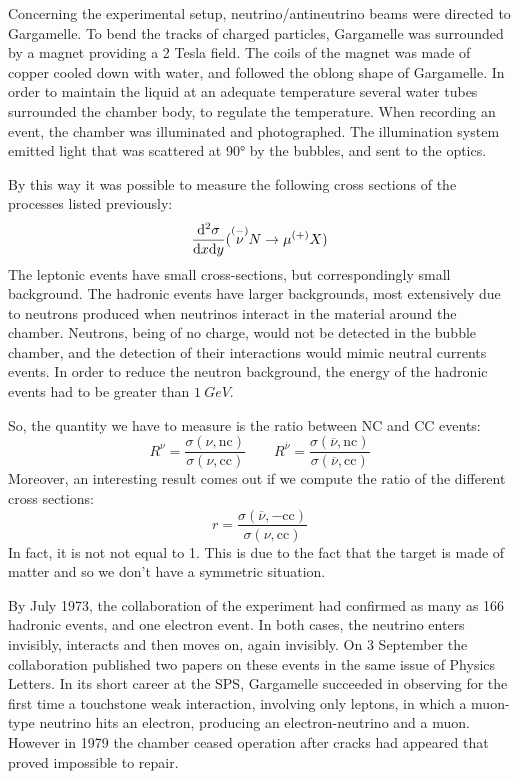 \documentclass[../../main/main.tex]{subfiles}
\begin{document}
Concerning the experimental setup, neutrino/antineutrino beams were directed to Gargamelle. To bend the tracks of charged particles, Gargamelle was surrounded by a magnet providing a 2 Tesla field. The coils of the magnet was made of copper cooled down with water, and followed the oblong shape of Gargamelle. In order to maintain the liquid at an adequate temperature several water tubes surrounded the chamber body, to regulate the temperature. When recording an event, the chamber was illuminated and photographed. The illumination system emitted light that was scattered at 90° by the bubbles, and sent to the optics.

By this way it was possible to measure the following cross sections of the processes listed previously:
\begin{equation}
	\frac{\mathrm{d}{^2\sigma}}{\mathrm{d}{x} \mathrm{d}{y}}(\overset{(-)}{\nu}N \rightarrow \mu^{(+)}X)
	\label{eq:}
\end{equation}
The leptonic events have small cross-sections, but correspondingly small background. The hadronic events have larger backgrounds, most extensively due to neutrons produced when neutrinos interact in the material around the chamber. Neutrons, being of no charge, would not be detected in the bubble chamber, and the detection of their interactions would mimic neutral currents events. In order to reduce the neutron background, the energy of the hadronic events had to be greater than \( 1 \ \si{GeV} \).

So, the quantity we have to measure is the ratio between NC and CC events:
\begin{equation}
	R^{\nu}
	=
	\frac{\sigma(\nu, \text{nc})}{\sigma(\nu, \text{cc})}
	\qquad
	R^{\overline{\nu}}
	=
	\frac{\sigma(\overline{\nu}, \text{nc})}{\sigma(\overline{\nu}, \text{cc})}
	\label{eq:}
\end{equation}
Moreover, an interesting result comes out if we compute the ratio of the different cross sections:
\begin{equation}
	r
	=
	\frac{\sigma(\overline{\nu}, -\text{cc})}{\sigma(\nu, \text{cc})}
	\label{eq:}
\end{equation}
In fact, it is not not equal to 1. This is due to the fact that the target is made of matter and so we don't have a symmetric situation.

By July 1973, the collaboration of the experiment had confirmed as many as 166 hadronic events, and one electron event. In both cases, the neutrino enters invisibly, interacts and then moves on, again invisibly. On 3 September the collaboration published two papers on these events in the same issue of Physics Letters. In its short career at the SPS, Gargamelle succeeded in observing for the first time a touchstone weak interaction, involving only leptons, in which a muon-type neutrino hits an electron, producing an electron-neutrino and a muon. However in 1979 the chamber ceased operation after cracks had appeared that proved impossible to repair.
\end{document}
